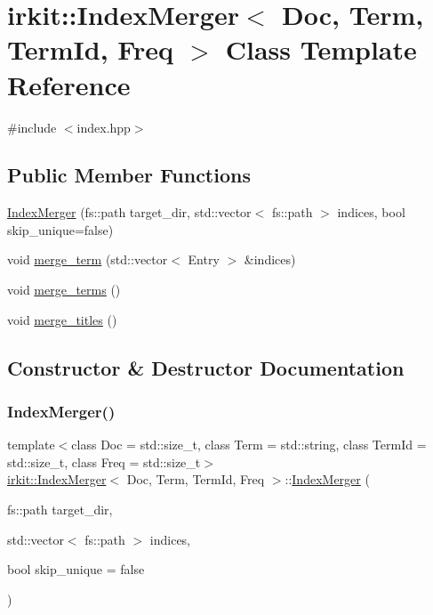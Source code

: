 \hypertarget{classirkit_1_1IndexMerger}{}\section{irkit\+:\+:Index\+Merger$<$ Doc, Term, Term\+Id, Freq $>$ Class Template Reference}
\label{classirkit_1_1IndexMerger}


{\ttfamily \#include $<$index.\+hpp$>$}

\subsection*{Public Member Functions}
\begin{DoxyCompactItemize}
\item 
\mbox{\hyperlink{classirkit_1_1IndexMerger_a5e1a66beacbc0808f3ed487572aec8bf}{Index\+Merger}} (fs\+::path target\+\_\+dir, std\+::vector$<$ fs\+::path $>$ indices, bool skip\+\_\+unique=false)
\item 
void \mbox{\hyperlink{classirkit_1_1IndexMerger_aabfc3277d370138aa02a8ee48da810db}{merge\+\_\+term}} (std\+::vector$<$ Entry $>$ \&indices)
\item 
void \mbox{\hyperlink{classirkit_1_1IndexMerger_a1dcf1ca9ee8faa142b9d38bde59757fa}{merge\+\_\+terms}} ()
\item 
void \mbox{\hyperlink{classirkit_1_1IndexMerger_a7c510436b6dbc5999404e2f8dd1818b7}{merge\+\_\+titles}} ()
\end{DoxyCompactItemize}


\subsection{Constructor \& Destructor Documentation}
\mbox{\label{classirkit_1_1IndexMerger_a5e1a66beacbc0808f3ed487572aec8bf}} 
\subsubsection{\texorpdfstring{Index\+Merger()}{IndexMerger()}}
{\footnotesize\ttfamily template$<$class Doc  = std\+::size\+\_\+t, class Term  = std\+::string, class Term\+Id  = std\+::size\+\_\+t, class Freq  = std\+::size\+\_\+t$>$ \\
\mbox{\hyperlink{classirkit_1_1IndexMerger}{irkit\+::\+Index\+Merger}}$<$ Doc, Term, Term\+Id, Freq $>$\+::\mbox{\hyperlink{classirkit_1_1IndexMerger}{Index\+Merger}} (\begin{DoxyParamCaption}\item[{fs\+::path}]{target\+\_\+dir,  }\item[{std\+::vector$<$ fs\+::path $>$}]{indices,  }\item[{bool}]{skip\+\_\+unique = {\ttfamily false} }\end{DoxyParamCaption})\hspace{0.3cm}{\ttfamily [inline]}}



